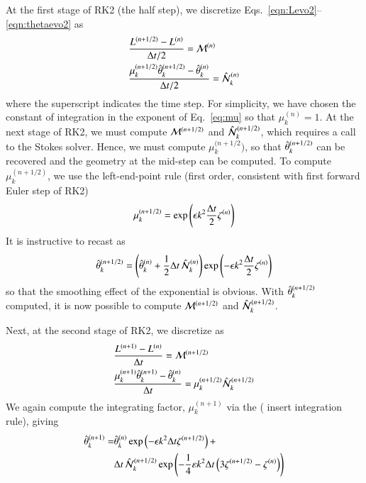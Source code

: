 \documentclass[preprint, 10pt]{elsarticle}
\begin{document}
At the first stage of RK2 (the half step), we discretize Eqs.~\eqref{eqn:Levo2}--\eqref{eqn:thetaevo2} as
\begin{align}
\label{eq:L12}
& \frac{L^{(n+1/2)} - L^{(n)}}{\Delta t/2} = \mathcal{M}^{(n)} \\
& \frac{ \mu_k^{(n+1/2)} \hat{\theta}_k^{(n+1/2)} - \hat{\theta}_k^{(n)}}{\Delta t/2} = \hat{\mathcal{N}}_k^{(n)}
\end{align}
where the superscript indicates the time step. For simplicity, we have chosen the constant of integration in the exponent of Eq.~\eqref{eq:mu} so that $\mu_k^{(n)} = 1$. At the next stage of RK2, we must compute $\mathcal{M}^{(n+1/2)}$ and $\hat{\mathcal{N}}_k^{(n+1/2)}$, which requires a call to the Stokes solver. Hence, we must compute $\mu_k^{(n+1/2})$, so that $\hat{\theta}_k^{(n+1/2)}$ can be recovered and the geometry at the mid-step can be computed. To compute $\mu_k^{(n+1/2)}$, we use the left-end-point rule (first order, consistent with first forward Euler step of RK2)
\begin{equation}
\mu_k^{(n+1/2)} = \exp \left( \epsilon k^2 \frac{\Delta t}{2} \zeta^{(n)}\right)
\end{equation}
It is instructive to recast as
\begin{equation}
\hat{\theta}_k^{(n+1/2)} = \left( \hat{\theta}_k^{(n)} + \frac{1}{2} \Delta t \, \hat{\mathcal{N}}_k^{(n)} \right)
\exp \left( -\epsilon k^2 \frac{\Delta t}{2} \zeta^{(n)}\right)
\end{equation}
so that the smoothing effect of the exponential is obvious. With $\hat{\theta}_k^{(n+1/2)}$ computed, it is now possible to compute $\mathcal{M}^{(n+1/2)}$ and $\hat{\mathcal{N}}_k^{(n+1/2)}$.

Next, at the second stage of RK2, we discretize as
\begin{align}
& \frac{L^{(n+1)} - L^{(n)}}{\Delta t} = \mathcal{M}^{(n+1/2)} \\
& \frac{ \mu_k^{(n+1)} \hat{\theta}_k^{(n+1)} - \hat{\theta}_k^{(n)}}{\Delta t} = \mu_k^{(n+1/2)} \hat{\mathcal{N}}_k^{(n+1/2)}
\end{align}
We again compute the integrating factor, $\mu_k^{(n+1)}$ via the ( insert integration rule), giving
\begin{align}
\hat{\theta}_k^{(n+1)} = 
& \hat{\theta}_k^{(n)}
\exp \left( - \epsilon k^2 \Delta t \zeta^{(n+1/2)} \right) +  \\
& \Delta t \, \hat{\mathcal{N}}_k^{(n+1/2)}
\exp \left( - \frac{1}{4} \varepsilon k^2 \Delta t \left( 3 \zeta^{(n+1/2)} - \zeta^{(n)} \right) \right)
\end{align}


\newpage
{} 
\end{document}
